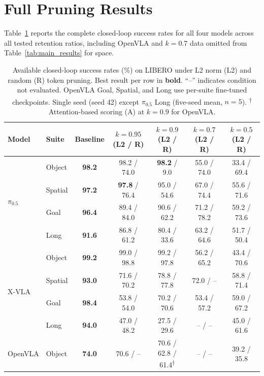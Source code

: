 \appendix

\section{Full Pruning Results}
\label{app:full_results}

Table~\ref{tab:full_results} reports the complete closed-loop success rates for all four models across all tested retention ratios, including OpenVLA and $k{=}0.7$ data omitted from Table~\ref{tab:main_results} for space.

\begin{table}[ht]
\centering
\footnotesize
\caption{Available closed-loop success rates (\%) on LIBERO under L2 norm (L2) and random (R) token pruning. Best result per row in \textbf{bold}. ``--'' indicates condition not evaluated. OpenVLA Goal, Spatial, and Long use per-suite fine-tuned checkpoints. Single seed (seed 42) except $\pi_{0.5}$ Long (five-seed mean, $n{=}5$). \textsuperscript{$\dagger$}Attention-based scoring (A) at $k{=}0.9$ for OpenVLA.}
\label{tab:full_results}
\setlength{\tabcolsep}{4pt}
\begin{tabular}{llccccc}
\toprule
Model & Suite & Baseline & $k{=}0.95$ (L2 / R) & $k{=}0.9$ (L2 / R) & $k{=}0.7$ (L2 / R) & $k{=}0.5$ (L2 / R) \\
\midrule
\multirow{4}{*}{$\pi_{0.5}$}
& Object  & \textbf{98.2} & 98.2 / 74.0 & \textbf{98.2} / 9.0 & 55.0 / 74.0 & 33.4 / 69.4 \\
& Spatial & \textbf{97.2} & \textbf{97.8} / 76.4 & 95.0 / 54.6 & 67.0 / 74.4 & 55.6 / 71.6 \\
& Goal    & \textbf{96.4} & 89.4 / 84.0 & 90.6 / 62.2 & 71.2 / 78.2 & 59.2 / 73.6 \\
& Long    & \textbf{91.6} & 86.8 / 61.2 & 80.4 / 33.6 & 63.2 / 64.6 & 51.7 / 50.4 \\
\midrule
\multirow{4}{*}{X-VLA}
& Object  & \textbf{99.2} & 99.0 / 98.8 & 99.2 / 97.8 & 56.2 / 65.2 & 43.4 / 70.6 \\
& Spatial & \textbf{93.0} & 71.6 / 70.2 & 78.8 / 77.8 & 72.0 / -- & 58.8 / 71.4 \\
& Goal    & \textbf{98.4} & 53.8 / 54.0 & 70.2 / 70.6 & 53.4 / 57.2 & 59.0 / 67.2 \\
& Long    & \textbf{94.0} & 47.0 / 48.2 & 27.5 / 29.6 & -- / -- & 45.0 / 61.6 \\
\midrule
\multirow{4}{*}{OpenVLA}
& Object  & \textbf{74.0} & 70.6 / -- & 70.6 / 62.8 / 61.4\textsuperscript{$\dagger$} & -- / -- & 39.2 / 35.8 \\

\end{tabular}
\end{table}
